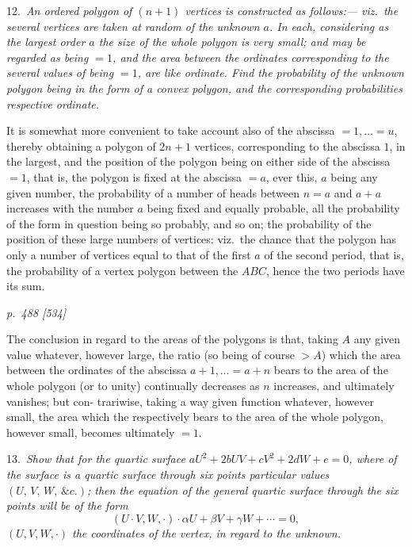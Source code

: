 \documentclass[11pt,a4paper]{book}
\begin{document}
\smallskip
\noindent\textsc{12.}\, \textit{An ordered polygon of $(n + 1)$ vertices is constructed as follows:--- viz.\ the
several vertices are taken at random of the unknown $a$. In each, considering as the
largest order $a$ the size of the whole polygon is very small; and may be regarded
as being $= 1$, and the area between the ordinates corresponding to the several values
of being $= 1$, are like ordinate. Find the probability of the unknown polygon being
in the form of a convex polygon, and the corresponding probabilities respective ordinate.}

It is somewhat more convenient to take account also of the abscissa $= 1, \ldots = u$, thereby obtaining a polygon of $2n + 1$ vertices, corresponding to the abscissa $1$, in
the largest, and the position of the polygon being on either side of the abscissa $= 1$, that is, the polygon is fixed at the abscissa $= a$,
ever this, $a$ being any given number, the probability of a number of heads between
$n = a$ and $a + a$ increases with the number $a$ being fixed and equally probable, all
the probability of the form in question being so probably, and so on; the probability of the position of these large numbers of vertices: viz.\
the chance that the polygon has only a number of vertices equal to that of the first $a$
of the second period, that is, the probability of a vertex polygon between the
$ABC$, hence the two periods have its sum.

\clearpage

\bigskip
\textit{p.~488 [534]}
\smallskip

\noindent
The conclusion in regard to the areas of the polygons is that, taking $A$ any given
value whatever, however large, the ratio (so being of course $> A$) which the area between the
ordinates of the abscissa $a + 1, \ldots = a + n$ bears to the area of the whole polygon
(or to unity) continually decreases as $n$ increases, and ultimately vanishes; but con-
trariwise, taking a way given function whatever, however small, the area which the
respectively bears to the area of the whole polygon, however small, becomes ultimately $=1$.

\smallskip
\noindent\textsc{13.}\, \textit{Show that for the quartic surface $aU^2 + 2bU V + cV^2 + 2dW + e = 0$, where
of the surface is a quartic surface through six points particular values $(U,\,V,\,W,\,\&c.)$;
then the equation of the general quartic surface through the six points will be of
the form}
\[
(U \cdot V, W, \cdot)\cdot \alpha U + \beta V + \gamma W + \cdots = 0,
\]
\textit{$(U, V, W, \cdot)$ the coordinates of the vertex, in regard to the unknown.}
\end{document}
